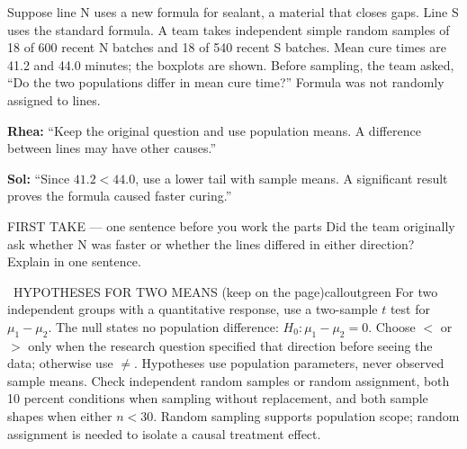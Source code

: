 \documentclass[11pt]{article}
\begin{document}


Suppose line N uses a new formula for sealant, a material that closes gaps. Line S uses the standard formula. A team takes independent simple random samples of 18 of 600 recent N batches and 18 of 540 recent S batches. Mean cure times are 41.2 and 44.0 minutes; the boxplots are shown. Before sampling, the team asked, ``Do the two populations differ in mean cure time?'' Formula was not randomly assigned to lines.\par\smallskip \textbf{Rhea:} ``Keep the original question and use population means. A difference between lines may have other causes.''\par \textbf{Sol:} ``Since $41.2<44.0$, use a lower tail with sample means. A significant result proves the formula caused faster curing.''\par
\begin{center}
\end{center}
\begin{firsttakebox}{FIRST TAKE --- one sentence before you work the parts}
Did the team originally ask whether N was faster or whether the lines differed in either direction? Explain in one sentence.
\workspace{0.9in}
\end{firsttakebox}

\begin{callout}{\IconBook\ HYPOTHESES FOR TWO MEANS (keep on the page)}{calloutgreen}
For two independent groups with a quantitative response, use a two-sample $t$ test for
$\mu_1-\mu_2$. The null states no population difference: $H_0:\mu_1-\mu_2=0$.
Choose $<$ or $>$ only when the research question specified that direction before seeing
the data; otherwise use $\neq$. Hypotheses use population parameters, never observed sample
means. Check independent random samples or random assignment, both 10 percent conditions
when sampling without replacement, and both sample shapes when either $n<30$. Random sampling
supports population scope; random assignment is needed to isolate a causal treatment effect.
\end{callout}
\end{document}
